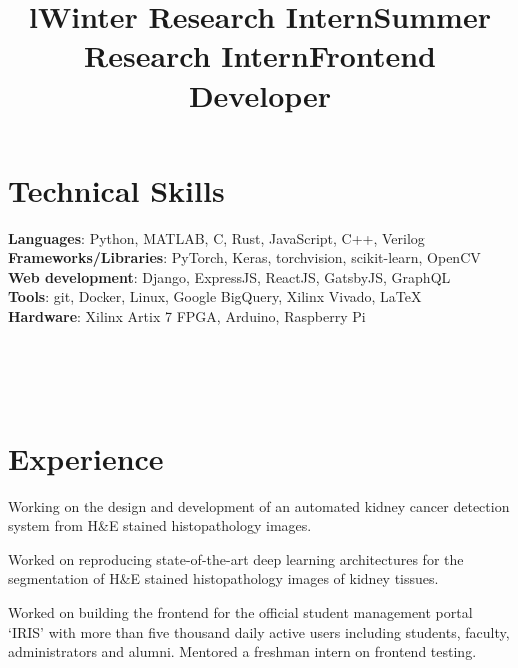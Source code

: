 \documentclass[margin]{res}
\begin{document}
\begin{resume}
    \section{Technical Skills}
      \textbf{Languages}: Python, MATLAB, C, Rust, JavaScript, C++, Verilog
      \\
      \textbf{Frameworks/Libraries}: PyTorch, Keras, torchvision, scikit-learn, OpenCV
      \\
      \textbf{Web development}: Django, ExpressJS, ReactJS, GatsbyJS, GraphQL
      \\
      \textbf{Tools}: git, Docker, Linux, Google BigQuery, Xilinx Vivado, \LaTeX
      \\
      \textbf{Hardware}: Xilinx Artix 7 FPGA, Arduino, Raspberry Pi


    \begin{format}
      \title{l}\\
      \\
      \body\\
    \end{format}

    \section{Experience}
      \title{\textbf{Winter Research Intern}}
      \begin{position}
        Working on the design and development of an automated kidney cancer detection system from H\&E stained histopathology images.
      \end{position}

      \title{\textbf{Summer Research Intern}}
      \begin{position}
          Worked on reproducing state-of-the-art deep learning architectures for the segmentation of H\&E stained histopathology images of kidney tissues.
      \end{position}

      \title{\textbf{Frontend Developer}}
      \begin{position}
        Worked on building the frontend for the official student management portal `IRIS' with more than five thousand daily active users including students, faculty, administrators and alumni.
        Mentored a freshman intern on frontend testing.
      \end{position}


\end{resume}
\end{document}
